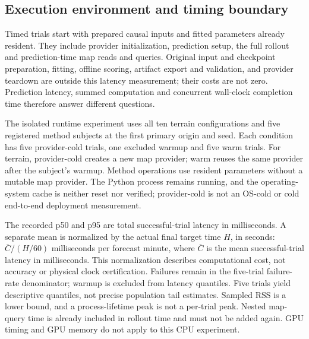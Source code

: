 \documentclass[11pt]{article}
\begin{document}
\subsection{Execution environment and timing boundary}
\label{sec:runtime-environment}
Timed trials start with prepared causal inputs and fitted parameters already
resident. They include provider initialization, prediction setup, the full
rollout and prediction-time map reads and queries. Original input and
checkpoint preparation, fitting, offline scoring, artifact export and
validation, and provider teardown are outside this latency measurement;
their costs are not zero. Prediction latency, summed computation and
concurrent wall-clock completion time therefore answer different questions.

The isolated runtime experiment uses all ten terrain configurations and five
registered method subjects at the first primary origin and seed. Each condition
has five provider-cold trials, one excluded warmup and five warm trials.
For terrain, provider-cold creates a new map provider; warm reuses the same
provider after the subject's warmup. Method operations use resident parameters
without a mutable map provider. The Python process remains running, and the
operating-system cache is neither reset nor verified; provider-cold is not
an OS-cold or cold end-to-end deployment measurement.

The recorded p50 and p95 are total successful-trial latency in milliseconds.
A separate mean is normalized by the actual final target time \(H\), in
seconds: \(\overline C/(H/60)\) milliseconds per forecast minute, where
\(\overline C\) is the mean successful-trial latency in milliseconds.
This normalization describes computational cost, not accuracy or physical
clock certification. Failures remain in the five-trial failure-rate
denominator; warmup is excluded from latency quantiles. Five trials yield
descriptive quantiles, not precise population tail estimates. Sampled RSS
is a lower bound, and a process-lifetime peak is not a per-trial peak.
Nested map-query time is already included in rollout time and must not be
added again. GPU timing and GPU memory do not apply to this CPU experiment.
\end{document}
